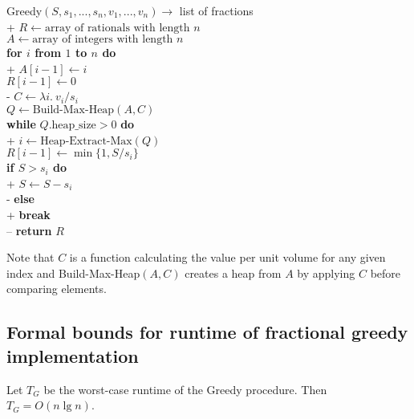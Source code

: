 \documentclass{article}
\begin{document}
\begin{pseudo}
	Greedy$(S, s_1, ..., s_n, v_1, ..., v_n)\to$ list of fractions\\+
	$R\leftarrow\text{array of rationals with length }n$\\
	$A\leftarrow\text{array of integers with length }n$\\
	\textbf{for $i$ from $1$ to $n$ do}\\+
	$A[i-1] \leftarrow i$\\
	$R[i-1] \leftarrow 0$\\-
	$C\leftarrow \lambda i.\:v_i/s_i$\\
	$Q\leftarrow\text{Build-Max-Heap}(A,C)$\\
	\textbf{while} $Q.\text{heap\_size}>0$ \textbf{do}\\+
	$i\leftarrow\text{Heap-Extract-Max}(Q)$\\
	$R[i-1]\leftarrow \min\{1, S/s_i\}$\\
	\textbf{if $S>s_i$ do}\\+
	$S\leftarrow S-s_i$\\-
	\textbf{else}\\+
	\textbf{break}\\--
	\textbf{return} $R$
\end{pseudo}

Note that $C$ is a function calculating the value per unit volume
for any given index and Build-Max-Heap$(A,C)$ creates a heap from $A$
by applying $C$ before comparing elements.

\subsection{Formal bounds for runtime of fractional greedy implementation}

\begin{claim}
	Let $T_G$ be the worst-case runtime of the Greedy procedure. Then $T_G=O(n\lg n)$.
\end{claim}
\end{document}
